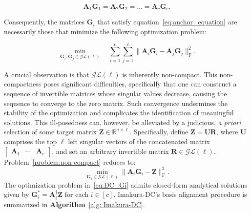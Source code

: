 \documentclass[final,3p,times]{elsarticle}
\theoremstyle{plain}
\newcommand{\matr}[1]{\bm{#1}}        %
\begin{document}
\begin{equation}
    \label{eq:anchor_equation}
    \matr{A}_1\matr{G}_1 = \matr{A}_2\matr{G}_2 = \dots = \matr{A}_c\matr{G}_c.
\end{equation}

Consequently, the matrices \(\matr{G}_i\) that satisfy equation~\eqref{eq:anchor_equation} are necessarily those that minimize the following optimization problem:

\begin{equation}
    \label{problem:non-compact}
    \min_{\matr{G}_i, \matr{G}_j \in \mathcal{GL}(\ell)}\quad
    \sum_{i=1}^{c}\sum_{j=1}^{c}
    \bigl\|
        \matr{A}_{i}\matr{G}_{i}-\matr{A}_{j}\matr{G}_{j}
    \bigr\|_{\mathrm{F}}^{2}.
\end{equation}

A crucial observation is that \( \mathcal{GL}(\ell) \) is inherently non-compact. This non-compactness poses significant difficulties, specifically that one can construct a sequence of invertible matrices whose singular values decrease, causing the sequence to converge to the zero matrix. Such convergence undermines the stability of the optimization and complicates the identification of meaningful solutions. This ill-posedness can, however, be alleviated by a judicious, \textit{a priori} selection of some target matrix \( \matr{Z} \in  \mathbb{R}^{a \times \ell} \). Specifically, define \( \matr{Z} = \matr{U}\matr{R} \), where \( \matr{U} \) comprises the top \(\ell\) left singular vectors of the concatenated matrix \(\begin{bmatrix}\matr{A}_1 & \cdots & \matr{A}_c\end{bmatrix}\), and set an arbitrary invertible matrix \(\matr{R} \in \mathcal{GL}(\ell)\). Problem~\eqref{problem:non-compact} reduces to:
\begin{equation}
    \label{eq:DC_Gi}
    \min_{\matr{G}_i \in \mathcal{GL}(\ell)} \|\matr{A}_i\matr{G}_i - \matr{Z}\|_\mathrm{F}^2.
\end{equation}
The optimization problem in~\eqref{eq:DC_Gi} admits closed-form analytical solutions given by \(\matr{G}_i^* = \matr{A}_i^\dagger \matr{Z}\) for each \(i \in [c]\). Imakura-DC's basis alignment procedure is summarized in \textbf{Algorithm}~\ref{alg: Imakura-DC}. 
\end{document}
